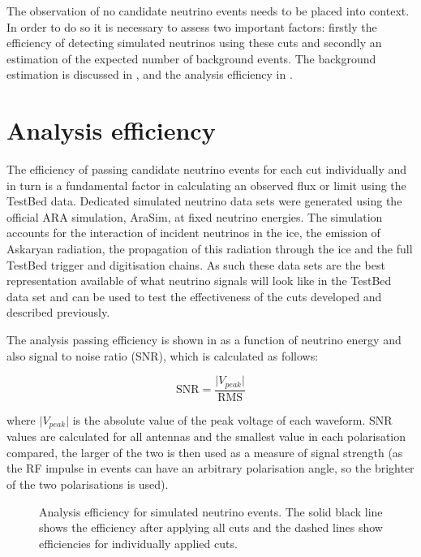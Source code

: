 The observation of no candidate neutrino events needs to be placed into context. In order to do so it is necessary to assess two important factors: firstly the efficiency of detecting simulated neutrinos using these cuts and secondly an estimation of the expected number of background events. The background estimation is discussed in , and the analysis efficiency in .


\section{Analysis efficiency}
\label{sec:Analysis:Efficiency}

The efficiency of passing candidate neutrino events for each cut individually and in turn is a fundamental factor in calculating an observed flux or limit using the TestBed data. Dedicated simulated neutrino data sets were generated using the official ARA simulation, AraSim, at fixed neutrino energies. The simulation accounts for the interaction of incident neutrinos in the ice, the emission of Askaryan radiation, the propagation of this radiation through the ice and the full TestBed trigger and digitisation chains. As such these data sets are the best representation available of what neutrino signals will look like in the TestBed data set and can be used to test the effectiveness of the cuts developed and described previously.

The analysis passing efficiency is shown in  as a function of neutrino energy and also signal to noise ratio (SNR), which is calculated as follows:

\begin{equation}
  \mbox{SNR} = \frac{\lvert V_{peak} \rvert}{\mbox{RMS}}
\end{equation}

\noindent where $\lvert V_{peak} \rvert$ is the absolute value of the peak voltage of each waveform. SNR values are calculated for all antennas and the smallest value in each polarisation compared, the larger of the two is then used as a measure of signal strength (as the RF impulse in events can have an arbitrary polarisation angle, so the brighter of the two polarisations is used).


\begin{figure}[htpb]
\hfill
{}
\caption{Analysis efficiency for simulated neutrino events. The solid black line shows the efficiency after applying all cuts and the dashed lines show efficiencies for individually applied cuts.}
\label{fig:Analysis:Cut-Results:Efficiency}
\end{figure}

